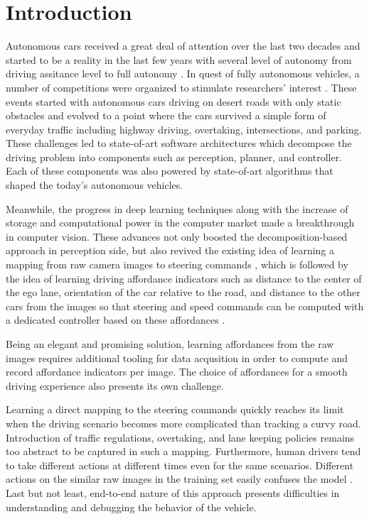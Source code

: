 \chapter{Introduction}
\label{chp:b1}

Autonomous cars received a great deal of attention over the last two decades
and started to be a reality in the last few years with several level of
autonomy from driving assitance level to full autonomy
\cite{Holstein2018EthicalAS}. In quest of fully autonomous vehicles, a number
of competitions were organized to stimulate researchers' interest
\cite{Buehler2007The2D, Buehler2009TheDU}. These events started with autonomous
cars driving on desert roads with only static obstacles and evolved to a point
where the cars survived a simple form of everyday traffic including highway
driving, overtaking, intersections, and parking. These challenges led to
state-of-art software architectures which decompose the driving problem into
components such as perception, planner, and controller. Each of these
components was also powered by state-of-art algorithms that shaped the today's
autonomous vehicles.

Meanwhile, the progress in deep learning techniques along with the increase of
storage and computational power in the computer market made a breakthrough in
computer vision. These advances not only boosted the decomposition-based
approach in perception side, but also revived the existing idea of learning a
mapping from raw camera images to steering commands \cite{Bojarski2016EndTE},
which is followed by the idea of learning driving affordance indicators such as
distance to the center of the ego lane, orientation of the car relative to the
road, and distance to the other cars from the images so that steering and speed
commands can be computed with a dedicated controller based on these affordances
\cite{Chen2015DeepDrivingLA}.

Being an elegant and promising solution, learning affordances from the raw
images requires additional tooling for data acqusition in order to compute and
record affordance indicators per image. The choice of affordances for a smooth
driving experience also presents its own challenge.

Learning a direct mapping to the steering commands quickly reaches its limit
when the driving scenario becomes more complicated than tracking a curvy
road. Introduction of traffic regulations, overtaking, and lane keeping
policies remains too abstract to be captured in such a mapping. Furthermore,
human drivers tend to take different actions at different times even for the
same scenarios. Different actions on the similar raw images in the training set
easily confuses the model \cite{Chen2015DeepDrivingLA}. Last but not least,
end-to-end nature of this approach presents difficulties in understanding and
debugging the behavior of the vehicle.

